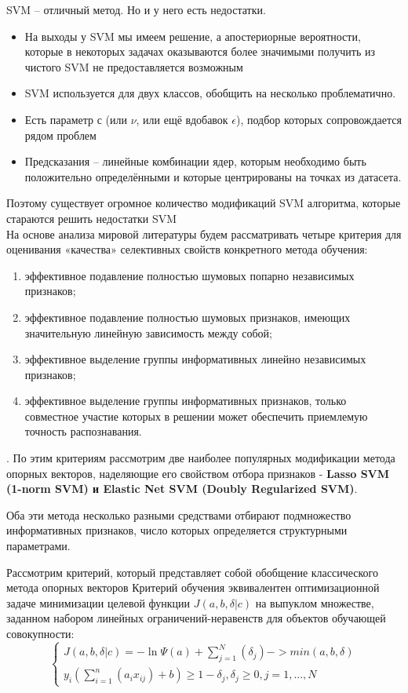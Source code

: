 \documentclass[../body.tex]{subfiles}
\begin{document}
\vspace{\baselineskip}
SVM – отличный метод. Но и у него есть недостатки.
\begin{itemize}
	\item  На выходы у SVM мы имеем решение, а апостериорные вероятности, которые в некоторых задачах оказываются более значимыми получить из чистого SVM не предоставляется возможным
	\item  SVM используется для двух классов, обобщить на несколько
	проблематично.
	\item Есть параметр $с$ (или $\nu$, или ещё вдобавок $\epsilon$), подбор которых сопровождается рядом проблем
	\item Предсказания – линейные комбинации ядер, которым
	необходимо быть положительно определёнными и которые
	центрированы на точках из датасета.
\end{itemize}
Поэтому существует огромное количество модификаций SVM алгоритма, которые стараются решить недостатки SVM 
\\

На основе анализа мировой литературы будем рассматривать четыре критерия для
оценивания «качества» селективных свойств конкретного метода обучения:
\begin{enumerate}
	\item эффективное подавление полностью шумовых попарно независимых признаков;
	\item эффективное подавление полностью шумовых признаков, имеющих значительную
	линейную зависимость между собой;
	\item  эффективное выделение группы информативных линейно независимых признаков;
	\item эффективное выделение группы информативных признаков, только совместное участие которых в решении может обеспечить приемлемую точность распознавания.
\end{enumerate}.
По этим критериям рассмотрим две наиболее популярных модификации метода опорных векторов, наделяющие его свойством отбора признаков - \textbf{Lasso SVM
	(1-norm SVM) и Elastic Net SVM (Doubly Regularized SVM)}.

\vspace{\baselineskip}
Оба эти метода несколько разными средствами отбирают подмножество информативных признаков, число которых определяется структурными параметрами.


Рассмотрим критерий, который представляет собой обобщение классического метода опорных векторов
Критерий обучения эквивалентен оптимизационной задаче минимизации целевой функции $J(a, b, \delta |c)$ на выпуклом множестве, заданном набором линейных ограничений-неравенств для объектов обучающей совокупности: 
$$\left\{\begin{matrix}
	J(a, b, \delta |c) = -\ln{\varPsi(a)}+ \sum_{j=1}^{N}(\delta_j)->min(a,b,\delta)
	\\
	y_i(\sum_{i=1}^{n}(a_ix_{ij})+b)\geq1-\delta_j, \delta_j \geq 0, j= 1,...,N
\end{matrix}\right.$$
\end{document}
